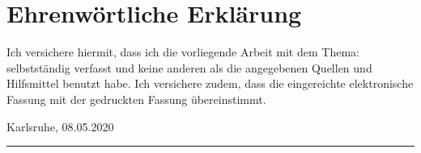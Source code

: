 
\clearpage
\chapter*{Ehrenwörtliche Erklärung}


Ich versichere hiermit, dass ich die vorliegende Arbeit mit dem Thema: \textit{\DerTitelDerArbeit} selbstständig verfasst und keine anderen als die angegebenen Quellen und Hilfsmittel benutzt habe. Ich versichere zudem, dass die eingereichte elektronische Fassung mit der gedruckten Fassung übereinstimmt.


\vspace{3cm}
\noindent Karlsruhe, 08.05.2020 \hfill\rule{5cm}{.4pt}\par
\noindent\hfill \DerAutorDerArbeit
